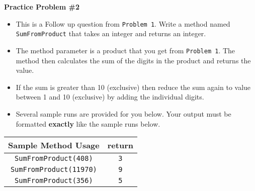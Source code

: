 \documentclass[12pt]{article}
\begin{document}
\noindent\textbf{Practice Problem \#2}
\begin{itemize}
	\item This is a Follow up question from \texttt{Problem 1}. Write a method named \texttt{SumFromProduct} that takes an integer and returns an integer.
	\item The method parameter is a product that you get from \texttt{Problem 1}. The method then calculates the sum of the digits in the product and returns the value.
	\item If the sum is greater than 10 (exclusive) then reduce the sum again to value between 1 and 10 (exclusive) by adding the individual digits.
	\item Several sample runs are provided for you below. Your output must be formatted \textbf{exactly} like the sample runs below.
\end{itemize}
\begin{center}
\begin{tabular}{| c | c |}
\hline\rule{0pt}{4ex}
Sample Method Usage & return \\
\hline\rule{0pt}{4ex}
\texttt{SumFromProduct(408)} & \texttt{3}\\
\hline\rule{0pt}{4ex}
\texttt{SumFromProduct(11970)} & \texttt{9}\\
\hline\rule{0pt}{4ex}
\texttt{SumFromProduct(356)} & \texttt{5}\\
\hline
\end{tabular}
\end{center}
	
\end{document}
